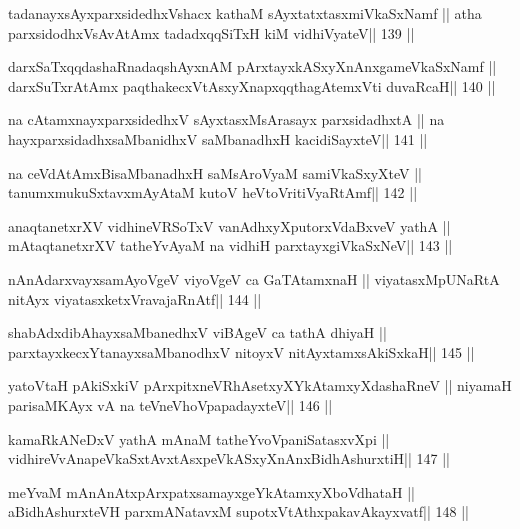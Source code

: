\begin{shl}
tadanayxsAyxparxsidedhxVshacx kathaM sAyxtatxtasxmiVkaSxNamf ||
atha parxsidodhxV\s sAvAtAmx tadadxqqSiTxH kiM vidhiVyateV\hfill || 139 ||
\end{shl}

\begin{shl}
darxSaTxqqdashaRnadaqshAyxnAM pArxtayxkASxyXnAnx\s\s gameVkaSxNamf ||
darxSuTxrAtAmx paqthakecxVtAsxyXnapxqqthagAtemxVti duvaRcaH\hfill || 140 ||
\end{shl}

\begin{shl}
na cA\s\s tamxnayxparxsidedhxV sAyxtasxMsArasayx parxsidadhxtA ||
na hayxparxsidadhxsaMbanidhxV saMbanadhxH kacidiSayxteV\hfill || 141 ||
\end{shl}

\begin{shl}
na ceVdAtAmxBisaMbanadhxH saMsAroV\s yaM samiVkaSxyXteV ||
tanumxmukuSxtavxmAyAtaM kutoV heVtoVritiVyaRtAmf\hfill || 142 ||
\end{shl}

\begin{shl}
anaqtanetxrXV vidhineVRSoTxV vanAdhxyXputorxVdaBxveV yathA ||
mAtaqtanetxrXV tatheYvAyaM na vidhiH parxtayxgiVkaSxNeV\hfill || 143 ||
\end{shl}

\begin{shl}
nAnAdarxvayxsamAyoVgeV viyoVgeV ca GaTAtamxnaH ||
viyatasxMpUNaRtA nitAyx viyatasxketxVravajaRnAtf\hfill || 144 ||
\end{shl}

\begin{shl}
shabAdxdibAhayxsaMbanedhxV viBAgeV ca tathA dhiyaH ||
parxtayxkecxYtanayxsaMbanodhxV nitoyxV nitAyxtamxsAkiSxkaH\hfill || 145 ||
\end{shl}

\begin{shl}
yatoV\s taH pAkiSxkiV pArxpitxneVRhAsetxyXYkAtamxyXdashaRneV ||
niyamaH parisaMKAyx vA na teVneVhoVpapadayxteV\hfill || 146 ||
\end{shl}

\begin{shl}
kamaRkANeDxV yathA mAnaM tatheYvoVpaniSatasxvXpi ||
vidhireVvAnapeVkaSxtAvxtAsxpeVkASxyXnAnxBidhAshurxtiH\hfill || 147 ||
\end{shl}

\begin{shl}
meYvaM mAnAnAtxpArxpatxsamayxgeYkAtamxyXboVdhataH ||
aBidhAshurxteVH parxmANatavxM supotxVtAthxpakavAkayxvatf\hfill || 148 ||
\end{shl}


